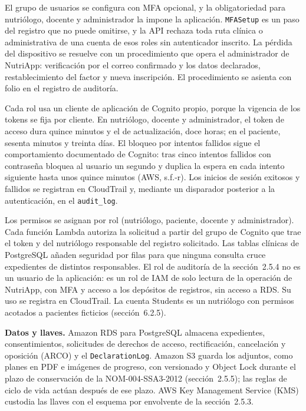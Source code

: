 \documentclass[12pt, a4paper]{article}
\begin{document}
El grupo de usuarios se configura con MFA opcional, y la obligatoriedad
para nutriólogo, docente y administrador la impone la aplicación.
\texttt{MFASetup} es un paso del registro que no puede omitirse, y la
API rechaza toda ruta clínica o administrativa de una cuenta de esos
roles sin autenticador inscrito. La pérdida del dispositivo se resuelve
con un procedimiento que opera el administrador de NutriApp:
verificación por el correo confirmado y los datos declarados,
restablecimiento del factor y nueva inscripción. El procedimiento se
asienta con folio en el registro de auditoría.

Cada rol usa un cliente de aplicación de Cognito propio, porque la
vigencia de los tokens se fija por cliente. En nutriólogo, docente y
administrador, el token de acceso dura quince minutos y el de
actualización, doce horas; en el paciente, sesenta minutos y treinta
días. El bloqueo por intentos fallidos sigue el comportamiento
documentado de Cognito: tras cinco intentos fallidos con contraseña
bloquea al usuario un segundo y duplica la espera en cada intento
siguiente hasta unos quince minutos (AWS, s.f.-r). Los inicios de sesión
exitosos y fallidos se registran en CloudTrail y, mediante un disparador
posterior a la autenticación, en el \texttt{audit\_log}.

Los permisos se asignan por rol (nutriólogo, paciente, docente y
administrador). Cada función Lambda autoriza la solicitud a partir del
grupo de Cognito que trae el token y del nutriólogo responsable del
registro solicitado. Las tablas clínicas de PostgreSQL añaden seguridad
por filas para que ninguna consulta cruce expedientes de distintos
responsables. El rol de auditoría de la sección~2.5.4 no es un usuario
de la aplicación: es un rol de IAM de solo lectura de la operación de
NutriApp, con MFA y acceso a los depósitos de registros, sin acceso a
RDS. Su uso se registra en CloudTrail. La cuenta Students es un
nutriólogo con permisos acotados a pacientes ficticios (sección~6.2.5).

\textbf{Datos y llaves.} Amazon RDS para PostgreSQL almacena
expedientes, consentimientos, solicitudes de derechos de acceso,
rectificación, cancelación y oposición (ARCO) y el
\texttt{DeclarationLog}. Amazon S3 guarda los adjuntos, como planes en
PDF e imágenes de progreso, con versionado y Object Lock durante el
plazo de conservación de la NOM-004-SSA3-2012 (sección~2.5.5); las
reglas de ciclo de vida actúan después de ese plazo. AWS Key Management
Service (KMS) custodia las llaves con el esquema por envolvente de la
sección~2.5.3.
\end{document}
